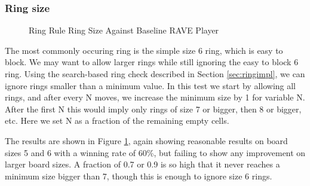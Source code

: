 \subsubsection{Ring size}

\begin{figure}
	\centering
{}
	\caption{Ring Rule Ring Size Against Baseline RAVE Player}
	\label{fig:ringsize}
\end{figure}

The most commonly occuring ring  is the simple size 6 ring, which is easy to block. We may want to allow larger rings while still ignoring the easy to block 6 ring. Using the search-based ring check described in Section \ref{sec:ringimpl}, we can ignore rings smaller than a minimum value. In this test we start by allowing all rings, and after every N moves, we increase the minimum size by 1 for variable N. After the first N this would imply only rings of size 7 or bigger, then 8 or bigger, etc. Here we set N as a fraction of the remaining empty cells.

The results are shown in Figure \ref{fig:ringsize}, again showing reasonable results on board sizes 5 and 6 with a winning rate of 60\%, but failing to show any improvement on larger board sizes. A fraction of 0.7 or 0.9 is so high that it never reaches a minimum size bigger than 7, though this is enough to ignore size 6 rings.



